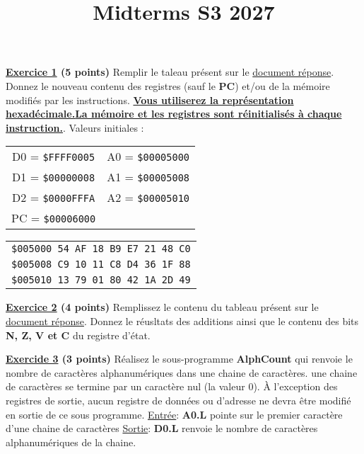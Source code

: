 \documentclass{article}
\author{}
\date{}
\title{Midterms S3 2027}
\begin{document}
\maketitle
\noindent\textbf{\underline{Exercice 1} (5 points)}\newline
Remplir le taleau présent sur le \underline{document réponse}. Donnez le nouveau contenu des registres (sauf le \textbf{PC}) et/ou de la mémoire modifiés par les instructions. \textbf{\underline{Vous utiliserez la représentation hexadécimale.}}\newline\textbf{\underline{La mémoire et les registres sont réinitialisés à chaque instruction.}}.\newline
Valeurs initiales :\newline\newline
\begin{tabular}{c c}
    D0 = \verb|$FFFF0005| & A0 = \verb|$00005000| \\
    D1 = \verb|$00000008| & A1 = \verb|$00005008| \\
    D2 = \verb|$0000FFFA| & A2 = \verb|$00005010| \\
    PC = \verb|$00006000|
\end{tabular}\newline
\begin{center}
\begin{tabular}{c}
    \verb|$005000 54 AF 18 B9 E7 21 48 C0| \\
    \verb|$005008 C9 10 11 C8 D4 36 1F 88|  \\
    \verb|$005010 13 79 01 80 42 1A 2D 49|
\end{tabular}
\end{center}

\noindent\textbf{\underline{Exercice 2} (4 points)}\newline
Remplissez le contenu du tableau présent sur le \underline{document réponse}. Donnez le réusltats des additions ainsi que le contenu des bits \textbf{N, Z, V et C} du registre d'état.\newline

\noindent\textbf{\underline{Exercide 3} (3 points)}\newline
Réalisez le sous-programme \textbf{AlphCount} qui renvoie le nombre de caractères alphanumériques dans une chaine de caractères. une chaine de caractères se termine par un caractère nul (la valeur 0). À l'exception des registres de sortie, aucun registre de données ou d'adresse ne devra être modifié en sortie de ce sous programme.\newline
\underline{Entrée}: \textbf{A0.L} pointe sur le premier caractère d'une chaine de caractères\newline
\underline{Sortie}: \textbf{D0.L} renvoie le nombre de caractères alphanumériques de la chaine.\newline\newline
\end{document}
